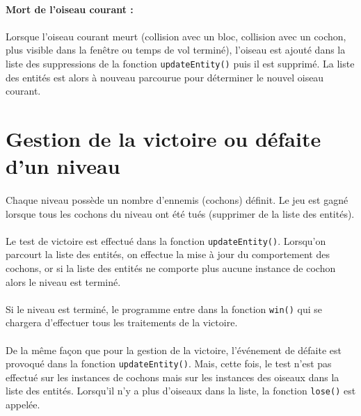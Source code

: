 \documentclass[a4paper,12pt]{report}
\begin{document}
\paragraph{Mort de l'oiseau courant :}

\paragraph{}Lorsque l'oiseau courant meurt (collision avec un bloc, collision avec un cochon, plus visible dans la fenêtre ou temps de vol terminé), l'oiseau est ajouté dans la liste des suppressions de la fonction \verb+updateEntity()+ puis il est supprimé. La liste des entités est alors à nouveau parcourue pour déterminer le nouvel oiseau courant.

\section{Gestion de la victoire ou défaite d'un niveau}

\paragraph{}Chaque niveau possède un nombre d’ennemis (cochons) définit. Le jeu est gagné lorsque tous les cochons du niveau ont été tués (supprimer de la liste des entités).
\paragraph{}Le test de victoire est effectué dans la fonction \verb+updateEntity()+. Lorsqu'on parcourt la liste des entités, on effectue la mise à jour du comportement des cochons, or si la liste des entités ne comporte plus aucune instance de cochon alors le niveau est terminé. 
\paragraph{}Si le niveau est terminé, le programme entre dans la fonction \verb+win()+ qui se chargera d'effectuer tous les traitements de la victoire.
\paragraph{}De la même façon que pour la gestion de la victoire, l'événement de défaite est provoqué dans la fonction \verb+updateEntity()+. Mais, cette fois, le test n'est pas effectué sur les instances de cochons mais sur les instances des oiseaux dans la liste des entités. Lorsqu'il n'y a plus d'oiseaux dans la liste, la fonction \verb+lose()+ est appelée.
\end{document}
